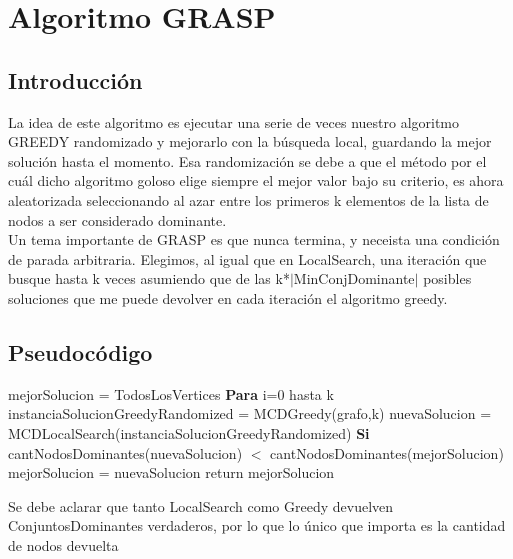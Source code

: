 \section{Algoritmo GRASP}

\subsection{Introducción}
La idea de este algoritmo es ejecutar una serie de veces nuestro algoritmo GREEDY randomizado y mejorarlo con la búsqueda local, guardando la mejor solución hasta el momento.
Esa randomización se debe a que el método por el cuál dicho algoritmo goloso elige siempre el mejor valor bajo su criterio, es ahora aleatorizada seleccionando al azar entre los primeros k elementos de la
lista de nodos a ser considerado dominante.\\
Un tema importante de GRASP es que nunca termina, y neceista una condición de parada arbitraria. Elegimos, al igual que en LocalSearch, una iteración que busque hasta k veces asumiendo que
de las k*$|$MinConjDominante$|$ posibles soluciones que me puede devolver en cada iteración el algoritmo greedy.

\subsection{Pseudocódigo}

\begin{codebox}
\li	mejorSolucion = TodosLosVertices
\li \textbf{Para} i=0 hasta k \Do
\li 	instanciaSolucionGreedyRandomized = MCDGreedy(grafo,k)
\li	nuevaSolucion = MCDLocalSearch(instanciaSolucionGreedyRandomized)
\li 	\textbf{Si} cantNodosDominantes(nuevaSolucion) $<$ cantNodosDominantes(mejorSolucion)  \Do
\li		mejorSolucion = nuevaSolucion
	\End
    \End	
\li	return mejorSolucion	
\end{codebox}
Se debe aclarar que tanto LocalSearch como Greedy devuelven ConjuntosDominantes verdaderos, por lo que lo único que importa es la cantidad de nodos devuelta

